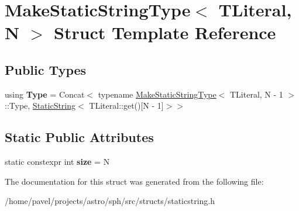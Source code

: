 \hypertarget{structMakeStaticStringType}{}\section{Make\+Static\+String\+Type$<$ T\+Literal, N $>$ Struct Template Reference}
\label{structMakeStaticStringType}
\subsection*{Public Types}
\begin{DoxyCompactItemize}
\item 
\hypertarget{structMakeStaticStringType_acdbc9649e6ed5fbe566c55dd30ad5b79}{}\label{structMakeStaticStringType_acdbc9649e6ed5fbe566c55dd30ad5b79} 
using {\bfseries Type} = Concat$<$ typename \hyperlink{structMakeStaticStringType}{Make\+Static\+String\+Type}$<$ T\+Literal, N -\/ 1 $>$\+::Type, \hyperlink{structStaticString}{Static\+String}$<$ T\+Literal\+::get()\mbox{[}N -\/ 1\mbox{]}$>$$>$
\end{DoxyCompactItemize}
\subsection*{Static Public Attributes}
\begin{DoxyCompactItemize}
\item 
\hypertarget{structMakeStaticStringType_a3a717ccaba38c76fa4d0a2d6295ca0ee}{}\label{structMakeStaticStringType_a3a717ccaba38c76fa4d0a2d6295ca0ee} 
static constexpr int {\bfseries size} = N
\end{DoxyCompactItemize}


The documentation for this struct was generated from the following file\+:\begin{DoxyCompactItemize}
\item 
/home/pavel/projects/astro/sph/src/structs/staticstring.\+h\end{DoxyCompactItemize}
